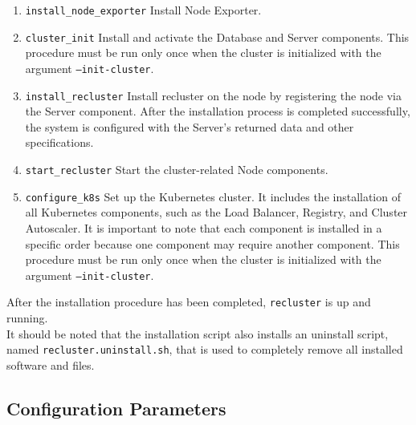 \begin{enumerate}
  \item \texttt{install\_node\_exporter}
    \newline
    Install Node Exporter.

  \item \texttt{cluster\_init}
    \newline
    Install and activate the Database and Server components.
    \newline
    This procedure must be run only once when the cluster is initialized with the
    argument \texttt{--init-cluster}.

  \item \texttt{install\_recluster}
    \newline
    Install recluster on the node by registering the node via the Server
    component.
    \newline
    After the installation process is completed successfully, the system is
    configured with the Server's returned data and other specifications.

  \item \texttt{start\_recluster}
    \newline
    Start the cluster-related Node components.

  \item \texttt{configure\_k8s}
    \newline
    Set up the Kubernetes cluster.
    \newline
    It includes the installation of all Kubernetes components, such as the Load
    Balancer, Registry, and Cluster Autoscaler. It is important to note that each
    component is installed in a specific order because one component may require
    another component.
    \newline
    This procedure must be run only once when the cluster is initialized with
    the argument \texttt{--init-cluster}.
\end{enumerate}

After the installation procedure has been completed, \texttt{recluster} is up and
running. \\ %
It should be noted that the installation script also installs an uninstall script,
named \texttt{recluster.uninstall.sh}, that is used to completely remove all
installed software and files.

\subsection{Configuration Parameters}
\label{subsec:implementation_installer_configuration_parameters}

